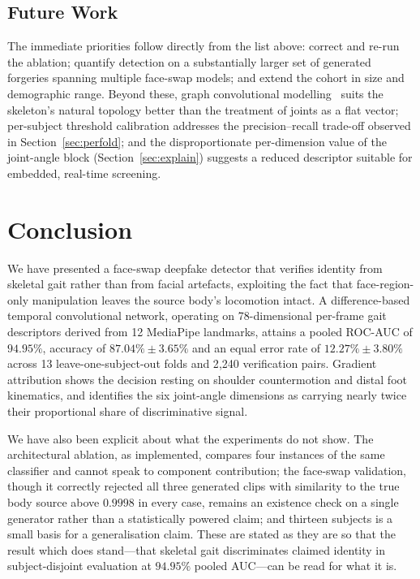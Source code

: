 \documentclass[journal]{IEEEtran}
\begin{document}
\subsection{Future Work}

The immediate priorities follow directly from the list above: correct and re-run
the ablation; quantify detection on a substantially larger set of generated
forgeries spanning multiple face-swap models; and extend the cohort in size and
demographic range. Beyond these, graph convolutional
modelling~\cite{gaitgraph} suits the skeleton's natural topology better than
the treatment of joints as a flat vector; per-subject threshold calibration
addresses the precision--recall trade-off observed in
Section~\ref{sec:perfold}; and the disproportionate per-dimension value of the
joint-angle block (Section~\ref{sec:explain}) suggests a reduced descriptor
suitable for embedded, real-time screening.

\section{Conclusion}
\label{sec:conclusion}

We have presented a face-swap deepfake detector that verifies identity from
skeletal gait rather than from facial artefacts, exploiting the fact that
face-region-only manipulation leaves the source body's locomotion intact. A
difference-based temporal convolutional network, operating on 78-dimensional
per-frame gait descriptors derived from 12 MediaPipe landmarks, attains a
pooled ROC-AUC of $94.95\%$, accuracy of $87.04\% \pm 3.65\%$ and an equal
error rate of $12.27\% \pm 3.80\%$ across 13 leave-one-subject-out folds and
2{,}240 verification pairs. Gradient attribution shows the decision resting on
shoulder countermotion and distal foot kinematics, and identifies the six
joint-angle dimensions as carrying nearly twice their proportional share of
discriminative signal.

We have also been explicit about what the experiments do not show. The
architectural ablation, as implemented, compares four instances of the same
classifier and cannot speak to component contribution; the face-swap
validation, though it correctly rejected all three generated clips with
similarity to the true body source above $0.9998$ in every case, remains an
existence check on a single generator rather than a statistically powered
claim; and thirteen subjects is a small basis for a generalisation claim.
These are stated as they are so that the result which does stand---that
skeletal gait discriminates claimed identity in subject-disjoint evaluation at
$94.95\%$ pooled AUC---can be read for what it is.
\end{document}
